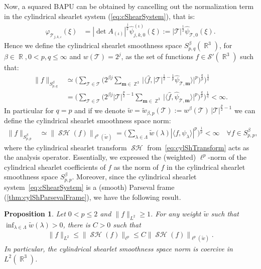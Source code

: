 \documentclass[11pt,a4paper]{article}
\numberwithin{equation}{section}
\newtheorem{proposition}[theorem]{Proposition}
\def\<{\langle}
\def\>{\rangle}
\DeclareMathOperator{\R}{\mathbb{R}}
\DeclareMathOperator{\Z}{\mathbb{Z}}
\newcommand{\abs}[1]{\left|#1\right|}
\newcommand{\gen}{\psi} %
\newcommand{\hatgen}{\widehat{\gen}}
\newcommand{\bapu}{\varphi} %
\newcommand{\mcS}{\mathcal{S}}  %
\newcommand{\mcT}{\mathcal{T}}  %
\newcommand{\msT}{\mathscr{T}} %
\DeclareMathOperator{\sh}{\mathcal{SH}}
\renewcommand{\vec}[1]{\boldsymbol{#1}} %
\begin{document}
Now, a squared BAPU can be obtained by cancelling out the normalization term in the cylindrical shearlet system (\ref{eq:cShearSystem}), that is:
\begin{align} \label{eq:cylShBAPU}
    \bapu_{\msT_{j,k,\iota}}(\xi) &= \abs{\det A_{(\iota)}}^{\frac{j}{2}} \hatgen^{(\iota)}_{j,k,0}(\xi) := |\msT|^{\frac{1}{2}} \hatgen_{\msT,0}(\xi).
\end{align}
Hence we define the cylindrical shearlet smoothness space $S^\beta_{p,q}(\R^3)$, for $\beta \in \R, 0 < p,q \leqslant \infty$ and $w(\msT) = 2^j$, as the set of functions $f \in \mcS'(\R^3)$ such that:
\begin{align}
    \| f \|_{S^\beta_{p,q}} &\simeq \Big( \sum_{\msT \in \mcT} \Big( 2^{\beta j} \sum_{\vec{m} \in \Z^3} \big| \< \widehat{f}, |\msT|^{\frac{1}{2} - \frac{1}{p}} \hatgen_{\msT, \vec{m}} \> \big|^p \Big)^{\frac{q}{p}} \Big)^{\frac{1}{q}} \nonumber \\
    &= \Big( \sum_{\msT \in \mcT} \Big( 2^{\beta j} |\msT|^{\frac{p}{2} - 1} \sum_{\vec{m} \in \Z^3} \big| \< \widehat{f}, \hatgen_{\msT, \vec{m}} \> \big|^p \Big)^{\frac{q}{p}} \Big)^{\frac{1}{q}} < \infty.
\end{align}
In particular for $q = p$ and if we denote $\tilde{w} =\tilde{w}_{\beta,p}(\msT) :=  w^\beta (\msT) \, |\msT|^{\frac{p}{2}-1}$ we can define the cylindrical shearlet smoothness space norm:
\begin{align}
    \| f \|_{S^\beta_{p,p}} &\simeq \| \sh (f) \|_{\ell^p(\tilde{w})} = \Big( \sum_{\lambda \in \Lambda} \tilde{w}(\lambda)| \langle f, \psi_\lambda \rangle |^p \Big)^{\frac{1}{p}} <  \infty \quad \forall f \in S^\beta_{p,p},
\end{align}
where the cylindrical shearlet transform $\sh$ from~\eqref{eq:cylShTransform} acts as the analysis operator. Essentially, we expressed the (weighted) $\ell^p$-norm of the cylindrical shearlet coefficients
of $f$ as the norm of $f$ in the cylindrical shearlet smoothness space $S^\beta_{p,p}$.
Moreover, since the cylindrical shearlet system~\eqref{eq:cShearSystem} is a (smooth) Parseval frame (\cref{thm:cylShParsevalFrame}), we have the following result.
\begin{proposition}\label{prop:coercivity}
Let $0 < p \leq 2$ and $\| f \|_{L^2} \geq 1$. For any weight $\tilde{w}$ such that $\inf_{\lambda \in \Lambda} \tilde{w}(\lambda) > 0$, there is $C > 0$ such that
\begin{align} \label{eq:ell(w)bound}
    \|f\|_{L^2} \leq \| \sh (f) \|_{\ell^p} \leq C \| \sh (f) \|_{\ell^p(\tilde{w})}.
\end{align}
In particular, the cylindrical shearlet smoothness space norm is coercive in $L^2(\R^{3})$. 
\end{proposition}
\end{document}
